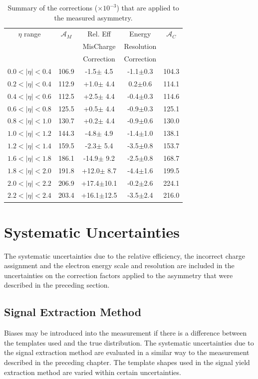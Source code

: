 \begin{table}[htbp]
  \begin{center}
    \begin{tabular}{ccccc}
\toprule
$\eta$ range & $\mathcal{A}_M$ & Rel. Eff & Energy & $\mathcal{A}_C$ \\
& & MisCharge & Resolution &  \\
& & Correction  & Correction & \\
\midrule
 $0.0<|\eta|<0.4$ & 106.9 &-1.5$\pm$ 4.5 & -1.1$\pm$0.3 & 104.3\\ 
 $0.2<|\eta|<0.4$ & 112.9 &+1.0$\pm$ 4.4 &  0.2$\pm$0.6 & 114.1\\ 
 $0.4<|\eta|<0.6$ & 112.5 &+2.5$\pm$ 4.4 & -0.4$\pm$0.3 & 114.6\\
 $0.6<|\eta|<0.8$ & 125.5 &+0.5$\pm$ 4.4 & -0.9$\pm$0.3 & 125.1\\ 
 $0.8<|\eta|<1.0$ & 130.7 &+0.2$\pm$ 4.4 & -0.9$\pm$0.6 & 130.0\\ 
 $1.0<|\eta|<1.2$ & 144.3 &-4.8$\pm$ 4.9 & -1.4$\pm$1.0 & 138.1\\ 
 $1.2<|\eta|<1.4$ & 159.5 &-2.3$\pm$ 5.4 & -3.5$\pm$0.8 & 153.7\\ 
 $1.6<|\eta|<1.8$ & 186.1 &-14.9$\pm$ 9.2 & -2.5$\pm$0.8 & 168.7\\
 $1.8<|\eta|<2.0$ & 191.8 &+12.0$\pm$ 8.7 & -4.4$\pm$1.6 & 199.5\\
 $2.0<|\eta|<2.2$ & 206.9 &+17.4$\pm$10.1&  -0.2$\pm$2.6 & 224.1\\
 $2.2<|\eta|<2.4$ & 203.4 &+16.1$\pm$12.5 & -3.5$\pm$2.4 & 216.0\\
\bottomrule
    \end{tabular}
    \caption{\label{tab:correctionfactors}Summary of the corrections ($\times
10^{-3}$) that are applied to the measured asymmetry\cite{bendavid2011electron}.}
  \end{center}
\end{table}


\section{Systematic Uncertainties}
The systematic uncertainties due to the relative efficiency, the incorrect
charge assignment and the electron energy scale and resolution are included in
the uncertainties on the correction factors applied to the asymmetry that were
described in the preceding section.

\subsection{Signal Extraction Method}
Biases may be introduced into the measurement if there is a
difference between the \ETm templates used and the true \ETm distribution. 
The systematic uncertainties due to the signal extraction method are evaluated
in a similar way to the measurement described in the preceding chapter.  The
template shapes used in the signal yield extraction method are varied within
certain uncertainties. 

